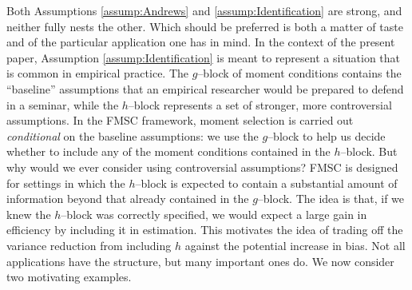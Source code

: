 \documentclass[12pt]{article}
\theoremstyle{definition}
\begin{document}
Both Assumptions \ref{assump:Andrews} and \ref{assump:Identification} are strong, and neither fully nests the other. 
Which should be preferred is both a matter of taste and of the particular application one has in mind.
In the context of the present paper, Assumption \ref{assump:Identification} is meant to represent a situation that is common in empirical practice. 
The $g$--block of moment conditions contains the ``baseline'' assumptions that an empirical researcher would be prepared to defend in a seminar, while the $h$--block represents a set of stronger, more controversial assumptions. 
In the FMSC framework, moment selection is carried out \emph{conditional} on the baseline assumptions: we use the $g$--block to help us decide whether to include any of the moment conditions contained in the $h$--block. 
But why would we ever consider using controversial assumptions? 
FMSC is designed for settings in which the $h$--block is expected to contain a substantial amount of information beyond that already contained in the $g$--block. 
The idea is that, if we knew the $h$--block was correctly specified, we would expect a large gain in efficiency by including it in estimation. 
This motivates the idea of trading off the variance reduction from including $h$ against the potential increase in bias. 
Not all applications have the structure, but many important ones do. 
We now consider two motivating examples. 
\end{document}

